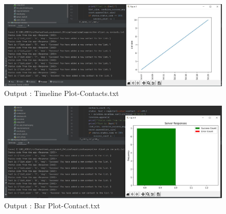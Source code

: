 \documentclass{resources/WeSTassignment}
\begin{document}
		\begin{figure}[ht]
    			\centering
    			\includegraphics[scale=0.4]{resources/finalContactstimeline.JPG}
    			\caption{Output : Timeline Plot-Contacts.txt}
    			\label{fig:Timeline Plot Contacts.txt}
\end{figure}

		\begin{figure}[ht]
    			\centering
    			\includegraphics[scale=0.4]{resources/finalContactBarPlot.JPG}
    			\caption{Output : Bar Plot-Contact.txt}
    			\label{fig: BarPlot - Contacts.txt}
\end{figure}
\end{document}
